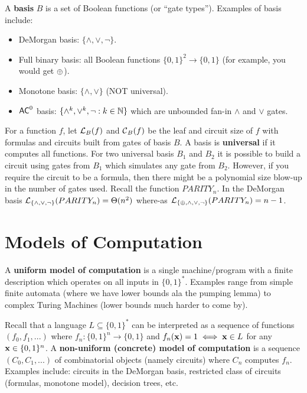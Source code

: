 \documentclass[11pt]{article}
\begin{document}
A \textbf{basis} $B$ is a set of Boolean functions (or ``gate types''). Examples of basis include: 
\begin{itemize}
	\item DeMorgan basis: $\{\land, \lor, \lnot\}$.
	\item Full binary basis: all Boolean functions $\{0,1\}^2 \rightarrow \{0,1\}$ (for example, you would get $\operatorname{\oplus}$).
	\item Monotone basis: $\{\land, \lor\}$ (NOT universal).
	\item $\mathsf{AC}^0$ basis: $\{\land^{k}, \lor^k, \lnot: k \in \mathbb{N}\}$ which are unbounded fan-in $\land$ and $\lor$ gates.
\end{itemize}
For a function $f$, let $\operatorname*{\mathcal{L}}_B(f)$ and $\operatorname*{\mathcal{C}}_B(f)$ be the leaf and circuit size of $f$ with formulas and circuits built from gates of basis $B$. A basis is \textbf{universal} if it computes all functions. For two universal basis $B_1$ and $B_2$ it is possible to build a circuit using gates from $B_1$ which simulates any gate from $B_2$. However, if you require the circuit to be a formula, then there might be a polynomial size blow-up in the number of gates used. Recall the function $PARITY_n$. In the DeMorgan basis $\operatorname*{\mathcal{L}}_{\{\land, \lor, \lnot\}}(PARITY_n) = \Theta(n^2)$ where-as $\operatorname*{\mathcal{L}}_{\{\operatorname{\oplus}, \land, \lor, \lnot\}}(PARITY_n) = n-1$.

\section{Models of Computation}
\label{sec:uniformvsconcrete}
\begin{definition}
	\label{def:mmodelsofcomputation} 
	A \textbf{uniform model of computation} is a single machine/program with a finite description which operates on all inputs in $\{0,1\}^*$. Examples range from simple finite automata (where we have lower bounds ala the pumping lemma) to complex Turing Machines (lower bounds much harder to come by).
	
	Recall that a language $L \subseteq \{0,1\}^*$ can be interpreted as a sequence of functions $(f_0, f_1, ...)$ where $f_n: \{0,1\}^n \rightarrow \{0,1\}$ and $f_n(\mathbf{x}) = 1 \iff \mathbf{x} \in L$ for any $\mathbf{x} \in \{0,1\}^n$. A \textbf{non-uniform (concrete) model of computation} is a sequence $(C_0, C_1, ...)$ of combinatorial objects (namely circuits) where $C_n$ computes $f_n$. Examples include: circuits in the DeMorgan basis, restricted class of circuits (formulas, monotone model), decision trees, etc.  
\end{definition}
\end{document}
